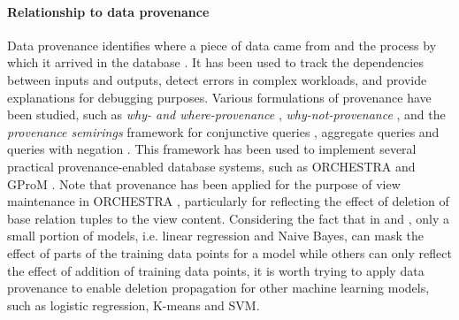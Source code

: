 \paragraph{Relationship to data provenance} Data provenance identifies where a piece of data came from and the process by which it arrived in the database \cite{buneman2001and}.  It has been used to track the dependencies between inputs and outputs, detect errors in complex workloads, and provide explanations for debugging purposes. Various formulations of provenance have been studied, such as \textit{why- and where-provenance} \cite{buneman2001and}, \textit{why-not-provenance} \cite{chapman2009not}, and the \textit{provenance semirings} framework %
for conjunctive queries \cite{green2007provenance}, aggregate queries \cite{amsterdamer2011provenance} and queries with negation \cite{xu2018provenance}.  This framework has been used to implement several practical provenance-enabled database systems, such as ORCHESTRA \cite{ives2008orchestra} and GProM \cite{arab2018gprom}. Note that provenance has been applied for the purpose of view maintenance in ORCHESTRA \cite{ives2008orchestra}, particularly for reflecting the effect of deletion of base relation tuples to the view content. Considering the fact that in \cite{deshpande2006mauvedb} and \cite{gupta2015processing}, only a small portion of models, i.e. linear regression and Naive Bayes, can mask the effect of parts of the training data points for a model while others can only reflect the effect of addition of training data points, it is worth trying to apply data provenance to enable deletion propagation for other machine learning models, such as logistic regression, K-means and SVM.



